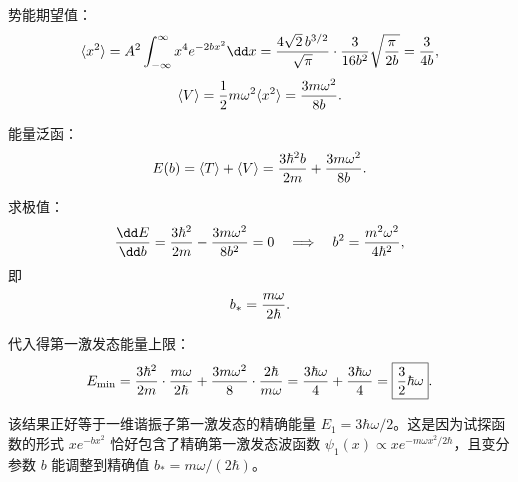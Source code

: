 \begin{solution}
势能期望值：
\[
\langle x^2\rangle=A^2\int_{-\infty}^\infty x^4e^{-2bx^2}\dd x
={4\sqrt2\,b^{3/2}\over\sqrt\pi}\cdot{3\over16b^2}\sqrt{\pi\over2b}
={3\over4b},
\]
\[
\langle V\rangle={1\over2}m\omega^2\langle x^2\rangle={3m\omega^2\over8b}.
\]

能量泛函：
\[
E(b)=\langle T\rangle+\langle V\rangle
={3\hbar^2b\over2m}+{3m\omega^2\over8b}.
\]

求极值：
\[
{\dd E\over\dd b}={3\hbar^2\over2m}-{3m\omega^2\over8b^2}=0
\quad\Longrightarrow\quad
b^2={m^2\omega^2\over4\hbar^2},
\]
即
\[
b_*={m\omega\over2\hbar}.
\]

代入得第一激发态能量上限：
\[
E_{\min}={3\hbar^2\over2m}\cdot{m\omega\over2\hbar}
+{3m\omega^2\over8}\cdot{2\hbar\over m\omega}
={3\hbar\omega\over4}+{3\hbar\omega\over4}
=\boxed{{3\over2}\hbar\omega}.
\]

该结果正好等于一维谐振子第一激发态的精确能量 $E_1=3\hbar\omega/2$。这是因为试探函数的形式 $xe^{-bx^2}$ 恰好包含了精确第一激发态波函数 $\psi_1(x)\propto x e^{-m\omega x^2/2\hbar}$，且变分参数 $b$ 能调整到精确值 $b_*=m\omega/(2\hbar)$。
\end{solution}

